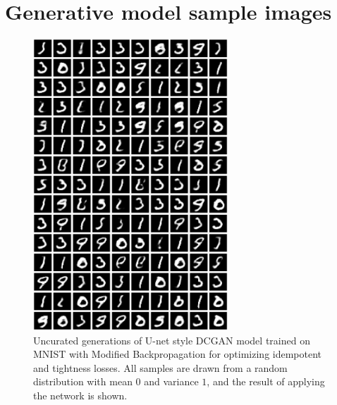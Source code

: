 \documentclass{article}
\theoremstyle{plain}
\theoremstyle{definition}
\theoremstyle{remark}
\begin{document}
\newpage
\section{Generative model sample images}
\label{app:gen-samples}
\begin{figure}[H]
    \centering
    \includegraphics[width=0.65\textwidth]{./resources/modified_0-1_0-1_rand_samples.png}
    \caption{Uncurated generations of U-net style DCGAN model trained on MNIST with Modified Backpropagation for optimizing idempotent and tightness losses. All samples are drawn from a random distribution with mean $0$ and variance $1$, and the result of applying the network is shown.}
    \label{fig:big-gen-mnist}
\end{figure}

\newpage
\end{document}
